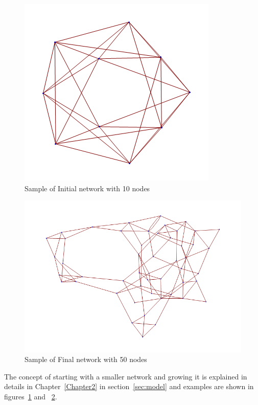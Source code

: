 \begin{figure}
\begin{center}
\includegraphics[scale=0.75]{Figures/network_init}
\end{center}
\caption{Sample of Initial network with 10 nodes}
\label{fig:network_init}
\end{figure}

\begin{figure}
\begin{center}
\includegraphics[scale=0.5]{Figures/network_final}
\end{center}
\caption{Sample of Final network with 50 nodes}
\label{fig:network_final}
\end{figure}

The concept of starting with a smaller network and growing it is explained in details in Chapter~\ref{Chapter2} in section~\ref{sec:model} and examples are shown in figures~\ref{fig:network_init} and ~\ref{fig:network_final}.

